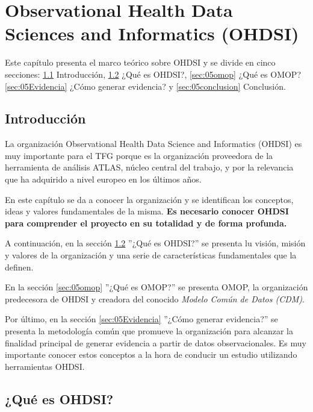 \chapter{Observational Health Data Sciences and Informatics (OHDSI)}\label{cap:05OHDSI}

Este capítulo presenta el marco teórico sobre OHDSI y se divide en cinco secciones:  \ref{sec:05intro} Introducción, \ref{sec:05OHDSI} ¿Qué es OHDSI?, \ref{sec:05omop} ¿Qué es OMOP? \ref{sec:05Evidencia} ¿Cómo generar evidencia? y \ref{sec:05conclusion} Conclusión.

\section{Introducción} \label{sec:05intro}

La organización Observational Health Data Science and Informatics (OHDSI) es muy importante para el TFG porque es la organización proveedora de la herramienta de análisis ATLAS, núcleo central del trabajo, y por la relevancia que ha adquirido a nivel europeo en los últimos años.

En este capítulo se da a conocer la organización y se identifican los conceptos, ideas y valores fundamentales de la misma. \textbf{Es necesario conocer OHDSI para comprender el proyecto en su totalidad y de forma profunda.} 

A continuación, en la sección \ref{sec:05OHDSI} ''¿Qué es OHDSI?'' se presenta lu visión, misión y valores de la organización y una serie de características fundamentales que la definen. 

En la sección \ref{sec:05omop} ''¿Qué es OMOP?'' se presenta  OMOP, la organización predecesora de OHDSI 
y creadora del conocido \textit{Modelo Común de Datos (CDM)}.

Por último, en la sección \ref{sec:05Evidencia} ''¿Cómo generar evidencia?'' se presenta la metodología común que promueve la organización para alcanzar la finalidad principal de generar evidencia a partir de datos observacionales. Es muy importante conocer estos conceptos a la hora de conducir un estudio utilizando herramientas OHDSI.

\section{¿Qué es OHDSI?} \label{sec:05OHDSI}

